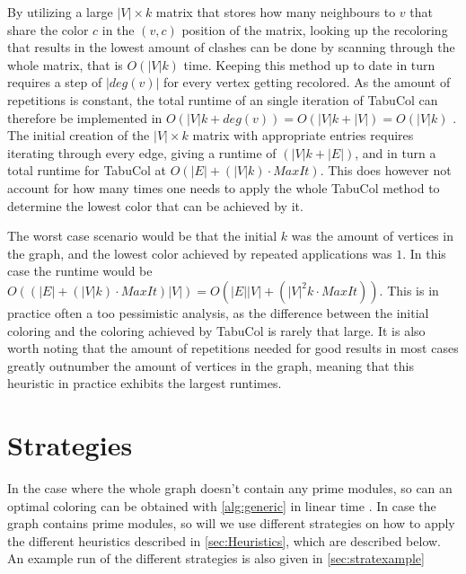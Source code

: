 \documentclass[a4paper]{article}
\begin{document}
By utilizing a large $|V| \times k$ matrix that stores how many neighbours to $v$ that share
the color $c$ in the $(v,c)$ position of the matrix, looking up the recoloring
that results in the lowest amount of clashes can be done by scanning through 
the whole matrix, that is $O(|V|k)$ time.
Keeping this method up to date in turn requires a step of $|deg(v)|$ for every
vertex getting recolored.  As the amount of repetitions is constant, the total
runtime of an single iteration of TabuCol can therefore be implemented in
$O(|V|k+deg(v)) = O(|V|k+|V|) = O(|V|k)$ \cite{Constructive}. The initial
creation of the $|V| \times k$ matrix with appropriate entries requires
iterating through every edge, giving a runtime of $(|V|k+|E|)$, and in turn a 
total runtime for TabuCol at $O(|E|+(|V|k)\cdot MaxIt)$. This does however
not account for how many times one needs to apply the whole TabuCol method to
determine the lowest color that can be achieved by it.

The worst case scenario would be that the initial $k$ was the amount of
vertices in the graph, and the lowest color achieved by repeated applications
was $1$. In this case the runtime would be $O((|E|+(|V|k)\cdot MaxIt)|V|) = O(
|E||V| + (|V|^2k\cdot MaxIt))$. This is in practice often a too
pessimistic analysis, as the difference between the initial coloring and the
coloring achieved by TabuCol is rarely that large. It is also worth noting that
the amount of repetitions needed for good results in most cases greatly
outnumber the amount of vertices in the graph, meaning that this heuristic in
practice exhibits the largest runtimes.

\section{Strategies}
\label{sec:Strategies}
In the case where the whole graph doesn't contain any prime modules, so can an
optimal coloring can be obtained with \autoref{alg:generic} in linear time
\cite{HCL}. In case the graph contains prime modules, so will we use different
strategies on how to apply the different heuristics described in
\autoref{sec:Heuristics}, which are described below. An example run of the
different strategies is also given in \autoref{sec:stratexample}
\end{document}
